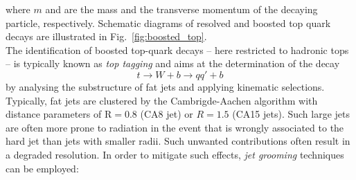 where $m$ and \pt are the mass and the transverse momentum of the decaying particle, respectively. Schematic diagrams of resolved and boosted top quark decays are illustrated in Fig.~\ref{fig:boosted_top}. \\
The identification of boosted top-quark decays -- here restricted to hadronic tops -- is typically known as \textit{top tagging} and aims at the determination of the decay
\begin{equation}
 t \rightarrow W + b \rightarrow qq' + b 
\end{equation} 
by analysing the substructure of fat jets and applying kinematic selections. Typically, fat jets are clustered by the Cambrigde-Aachen algorithm with distance parameters of $\mathrm{R} = 0.8$ (CA8 jet) or $R = 1.5$ (CA15 jets). Such large jets are often more prone to radiation in the event that is wrongly associated to the hard jet than jets with smaller radii. Such unwanted contributions often result in a degraded resolution. In order to mitigate such effects, \textit{jet grooming} techniques can be employed:

